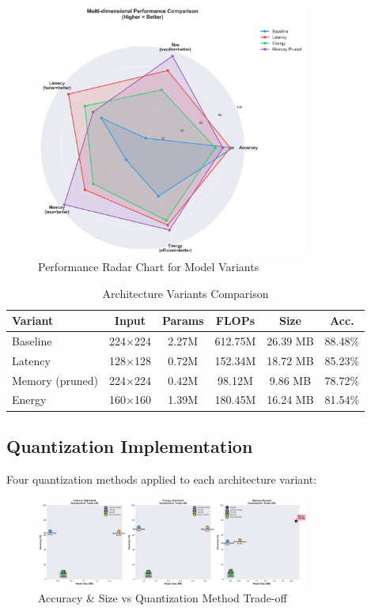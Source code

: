 \documentclass[10pt, a4paper]{article}
\begin{document}
\begin{figure}[H]
\centering
\includegraphics[width=0.8\textwidth]{charts/part2_performance_radar.png}
\caption{Performance Radar Chart for Model Variants}
\end{figure}


\begin{table}[H]
\centering
\footnotesize
\begin{tabular}{|l|c|c|c|c|c|}
\hline
\textbf{Variant} & \textbf{Input} & \textbf{Params} & \textbf{FLOPs} & \textbf{Size} & \textbf{Acc.} \\
\hline
Baseline & 224×224 & 2.27M & 612.75M & 26.39 MB & 88.48\% \\
Latency & 128×128 & 0.72M & 152.34M & 18.72 MB & 85.23\% \\
Memory (pruned) & 224×224 & 0.42M & 98.12M & 9.86 MB & 78.72\% \\
Energy & 160×160 & 1.39M & 180.45M & 16.24 MB & 81.54\% \\
\hline
\end{tabular}
\caption{Architecture Variants Comparison}
\end{table}



\subsection{Quantization Implementation}

Four quantization methods applied to each architecture variant:

\begin{figure}[H]
\centering
\includegraphics[width=0.8\textwidth]{charts/part2_quantization_accuracy_tradeoff.png}
\caption{Accuracy \& Size vs Quantization Method Trade-off}
\end{figure}
\end{document}
